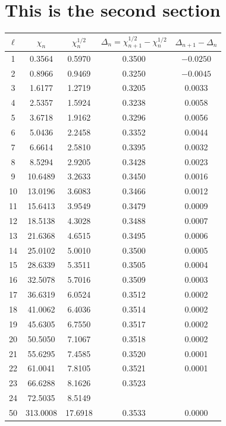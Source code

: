 \documentclass[12pt]{article}
\begin{document}
\lipsum

\section{This is the second section}

\begin{table}[h]
\centering\small
\begin{tabular}{ c | c c c c}
	$\ell$ & $\chi_n$ & $\chi_n^{1/2}$ & $\Delta_n = \chi^{1/2}_{n+1}-\chi^{1/2}_n$ & $\Delta_{n+1}-\Delta_{n}$\\\hline\hline
	1& 0.3564 & 0.5970 & 0.3500& $-0.0250$\\  
	2& 0.8966 & 0.9469 & 0.3250 & $-0.0045$\\  
	3& 1.6177 & 1.2719 & 0.3205 & 0.0033\\ 
	4& 2.5357 & 1.5924 & 0.3238 & 0.0058\\  
	5& 3.6718 & 1.9162 & 0.3296 & 0.0056\\  
	6& 5.0436 & 2.2458 & 0.3352 & 0.0044\\  
	7& 6.6614 & 2.5810 & 0.3395 & 0.0032\\  
	8& 8.5294 & 2.9205 & 0.3428 & 0.0023\\  
	9& 10.6489 & 3.2633& 0.3450 & 0.0016\\  
	10& 13.0196 & 3.6083 & 0.3466 & 0.0012\\  
	11& 15.6413 & 3.9549 & 0.3479 & 0.0009\\  
	12& 18.5138 & 4.3028 & 0.3488 & 0.0007\\  
	13& 21.6368 & 4.6515 & 0.3495 & 0.0006\\  
	14& 25.0102 & 5.0010 & 0.3500 & 0.0005\\  
	15& 28.6339 & 5.3511 & 0.3505 & 0.0004\\  
	16& 32.5078 & 5.7016 & 0.3509 & 0.0003\\  
	17& 36.6319 & 6.0524 & 0.3512 & 0.0002\\ 
	18& 41.0062 & 6.4036 & 0.3514 & 0.0002\\  
	19& 45.6305 & 6.7550 & 0.3517 & 0.0002\\   
	20& 50.5050 & 7.1067 & 0.3518 & 0.0002\\  
	21& 55.6295 & 7.4585 & 0.3520 & 0.0001\\   
	22& 61.0041 & 7.8105 & 0.3521 & 0.0001\\  
	23& 66.6288 & 8.1626 & 0.3523 &  \\
	24& 72.5035 & 8.5149 &  & \\\hline  
	50& 313.0008 & 17.6918 & 0.3533 & 0.0000 \\  

\end{tabular}
\end{table}
\end{document}
